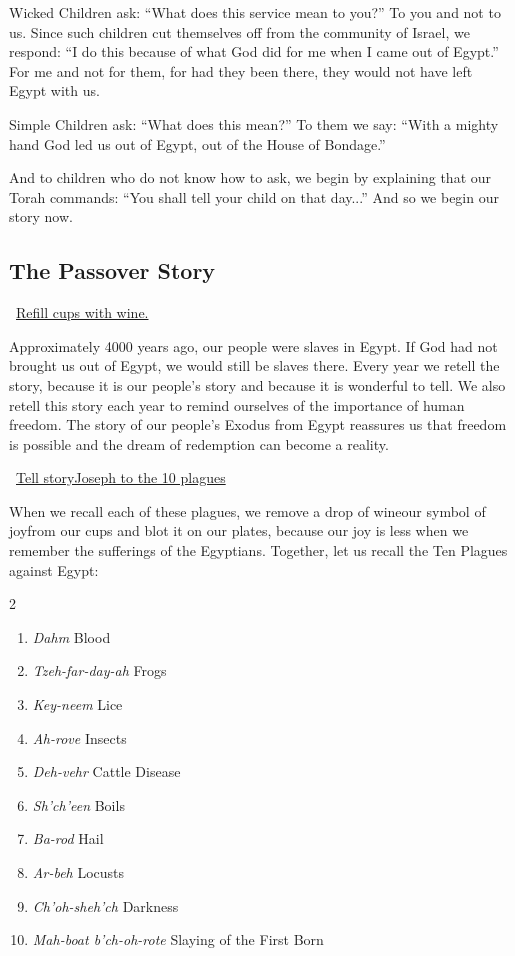 \documentclass[12pt]{article}
\newcommand{\god}{God}
\newcommand{\inlineSederAction}[1]{\faHandORight{}~\underline{#1}}
\newcommand{\sederAction}[1]{\inlineSederAction{#1}\par}
\begin{document}
Wicked Children ask: ``What does this service mean to you?'' To you and not to us. Since such children cut themselves off from the community of Israel, we respond: ``I do this because of what {\god} did for me when I came out of Egypt.'' For me and not for them, for had they been there, they would not have left Egypt with us.

Simple Children ask: ``What does this mean?'' To them we say: ``With a mighty hand {\god} led us out of Egypt, out of the House of Bondage.''

And to children who do not know how to ask, we begin by explaining that our Torah commands: ``You shall tell your child on that day...'' And so we begin our story now.

\subsection*{The Passover Story}
\sederAction{Refill cups with wine.}
Approximately 4000 years ago, our people were slaves in Egypt. If {\god} had not brought us out of Egypt, we would still be slaves there. Every year we retell the story, because it is our people's story and because it is wonderful to tell. We also retell this story each year to remind ourselves of the importance of human freedom. The story of our people's Exodus from Egypt reassures us that freedom is possible
and the dream of redemption can become a reality.

\sederAction{Tell story\textemdash{}Joseph to the 10 plagues}

When we recall each of these plagues, we remove a drop of wine\textemdash{}our symbol of joy\textemdash{}from our cups and blot it on our plates, because our joy is less when we remember the sufferings of the Egyptians. Together, let us recall the Ten Plagues against Egypt:
\begin{multicols}{2}
    \begin{enumerate}
        \item {} \textit{Dahm} Blood
        \item {} \textit{Tzeh-far-day-ah} Frogs
        \item {} \textit{Key-neem} Lice
        \item {} \textit{Ah-rove} Insects
        \item {} \textit{Deh-vehr} Cattle Disease
        \item {} \textit{Sh'ch'een} Boils
        \item {} \textit{Ba-rod} Hail
        \item {} \textit{Ar-beh} Locusts
        \item {} \textit{Ch'oh-sheh'ch} Darkness
        \item {} \textit{Mah-boat b'ch-oh-rote} Slaying of the First Born
    \end{enumerate}
\end{multicols}
\end{document}
